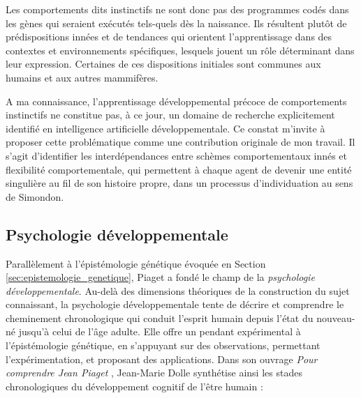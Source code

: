 Les comportements dits instinctifs ne sont donc pas des programmes codés dans les gènes qui seraient exécutés tels-quels dès la naissance. 
Ils résultent plutôt de prédispositions innées et de tendances qui orientent l'apprentissage dans des contextes et environnements spécifiques, lesquels jouent un rôle déterminant dans leur expression. 
Certaines de ces dispositions initiales sont communes aux humains et aux autres mammifères. 


A ma connaissance, l'apprentissage développemental précoce de comportements instinctifs ne constitue pas, à ce jour, un domaine de recherche explicitement identifié en intelligence artificielle développementale.
Ce constat m'invite à proposer cette problématique comme une contribution originale de mon travail. 
Il s'agit d'identifier les interdépendances entre schèmes comportementaux innés et flexibilité comportementale, qui permettent à chaque agent de devenir une entité singulière au fil de son histoire propre, dans un processus d'individuation au sens de Simondon.

\subsection{Psychologie développementale}

\noindent
Parallèlement à l'épistémologie génétique évoquée en Section \ref{sec:epistemologie_genetique}, Piaget a fondé le champ de la \emph{psychologie développementale}. 
Au-delà des dimensions théoriques de la construction du sujet connaissant, la psychologie développementale tente de décrire et comprendre le cheminement chronologique qui conduit l'esprit humain depuis l'état du nouveau-né jusqu'à celui de l'âge adulte.
Elle offre un pendant expérimental à l'épistémologie génétique, en s'appuyant sur des observations, permettant l'expérimentation, et proposant des applications. 
Dans son ouvrage \emph{Pour comprendre Jean Piaget} \cite{dolle_pour_1997}, Jean-Marie Dolle synthétise ainsi les stades chronologiques du développement cognitif de l'être humain :

